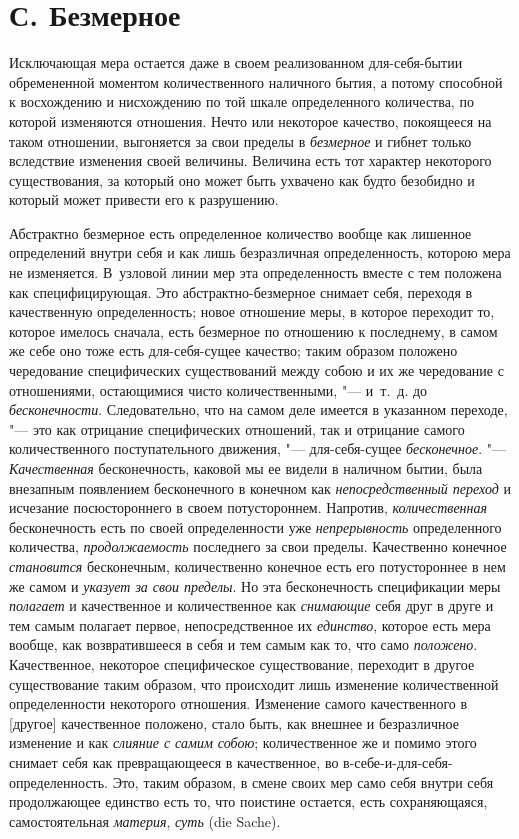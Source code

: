 \section[С. Безмерное]{С. Безмерное}
Исключающая мера остается даже в своем
реализованном для-себя-бытии обремененной моментом количественного
наличного бытия, а потому способной к восхождению и нисхождению по той
шкале определенного количества, по которой изменяются отношения. Нечто или
некоторое качество, покоящееся на таком отношении, выгоняется за свои
пределы в {\em безмерное} и гибнет только вследствие
изменения своей величины. Величина есть тот характер некоторого
существования, за который оно может быть ухвачено как будто безобидно и
который может привести его к разрушению.

Абстрактно безмерное есть определенное количество вообще как лишенное
определений внутри себя и как лишь безразличная определенность, которою
мера не изменяется. В~узловой линии мер эта определенность вместе с тем
положена как специфицирующая. Это абстрактно-безмерное снимает себя,
переходя в качественную определенность; новое отношение меры, в которое
переходит то, которое имелось сначала, есть безмерное по отношению к
последнему, в самом же себе оно тоже есть для-себя-сущее качество; таким
образом положено чередование специфических существований между собою и их
же чередование с отношениями, остающимися чисто количественными, "--- и~т.~д.
до {\em бесконечности}. Следовательно, что на самом
деле имеется в указанном переходе, "--- это как отрицание специфических
отношений, так и отрицание самого количественного поступательного движения,
"--- для-себя-сущее {\em бесконечное}. "---
{\em Качественная} бесконечность, каковой мы ее видели
в наличном бытии, была внезапным появлением бесконечного в конечном как
{\em непосредственный переход} и исчезание
посюстороннего в своем потустороннем. Напротив,
{\em количественная} бесконечность есть по своей
определенности уже {\em непрерывность} определенного
количества, {\em продолжаемость} последнего за свои
пределы. Качественно конечное {\em становится}
бесконечным, количественно конечное есть его потустороннее в нем же самом и
{\em указует за свои пределы}. Но эта бесконечность
спецификации меры {\em полагает} и качественное и
количественное как {\em снимающие} себя друг в друге и
тем самым полагает первое, непосредственное их
{\em единство}, которое есть мера вообще, как
возвратившееся в себя и тем самым как то, что само
{\em положено}. Качественное, некоторое специфическое
существование, переходит в другое существование таким образом, что
происходит лишь изменение количественной определенности некоторого
отношения. Изменение самого качественного в [другое] качественное положено,
стало быть, как внешнее и безразличное изменение и как
{\em слияние с самим собою}; количественное же и помимо
этого снимает себя как превращающееся в качественное, во
в-себе-и-для-себя-определенность. Это, таким образом, в смене своих мер
само себя внутри себя продолжающее единство есть то, что поистине остается,
есть сохраняющаяся, самостоятельная {\em материя},
{\em суть} (die Sache).

